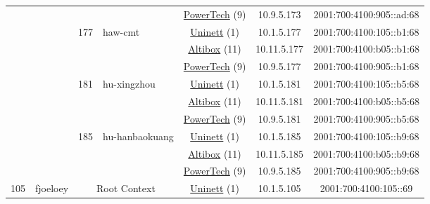 \begin{small}
\begin{center}
\begin{longtable}{|c|c|c|c|c|c|c|c|}
  &  &  &  & \multicolumn{2}{|c|}{\tiny{\href{http://www.powertech.no}{PowerTech} (9)}} & \tiny{10.9.5.173} & \tiny{2001:700:4100:905::ad:68} \\* \cline{3-3}\cline{4-4}\cline{5-5}\cline{6-6}\cline{7-7}\cline{8-8}
  &  & \multirow{3}{*}{\tiny{177}} & \multicolumn{1}{|l|}{\multirow{3}{*}{\tiny{haw-cmt}}} & \multicolumn{2}{|c|}{\tiny{\href{https://www.uninett.no}{Uninett} (1)}} & \tiny{10.1.5.177} & \tiny{2001:700:4100:105::b1:68} \\* \cline{5-5}\cline{6-6}\cline{7-7}\cline{8-8}
  &  &  &  & \multicolumn{2}{|c|}{\tiny{\href{https://www.altibox.no}{Altibox} (11)}} & \tiny{10.11.5.177} & \tiny{2001:700:4100:b05::b1:68} \\* \cline{5-5}\cline{6-6}\cline{7-7}\cline{8-8}
  &  &  &  & \multicolumn{2}{|c|}{\tiny{\href{http://www.powertech.no}{PowerTech} (9)}} & \tiny{10.9.5.177} & \tiny{2001:700:4100:905::b1:68} \\* \cline{3-3}\cline{4-4}\cline{5-5}\cline{6-6}\cline{7-7}\cline{8-8}
  &  & \multirow{3}{*}{\tiny{181}} & \multicolumn{1}{|l|}{\multirow{3}{*}{\tiny{hu-xingzhou}}} & \multicolumn{2}{|c|}{\tiny{\href{https://www.uninett.no}{Uninett} (1)}} & \tiny{10.1.5.181} & \tiny{2001:700:4100:105::b5:68} \\* \cline{5-5}\cline{6-6}\cline{7-7}\cline{8-8}
  &  &  &  & \multicolumn{2}{|c|}{\tiny{\href{https://www.altibox.no}{Altibox} (11)}} & \tiny{10.11.5.181} & \tiny{2001:700:4100:b05::b5:68} \\* \cline{5-5}\cline{6-6}\cline{7-7}\cline{8-8}
  &  &  &  & \multicolumn{2}{|c|}{\tiny{\href{http://www.powertech.no}{PowerTech} (9)}} & \tiny{10.9.5.181} & \tiny{2001:700:4100:905::b5:68} \\* \cline{3-3}\cline{4-4}\cline{5-5}\cline{6-6}\cline{7-7}\cline{8-8}
  &  & \multirow{3}{*}{\tiny{185}} & \multicolumn{1}{|l|}{\multirow{3}{*}{\tiny{hu-hanbaokuang}}} & \multicolumn{2}{|c|}{\tiny{\href{https://www.uninett.no}{Uninett} (1)}} & \tiny{10.1.5.185} & \tiny{2001:700:4100:105::b9:68} \\* \cline{5-5}\cline{6-6}\cline{7-7}\cline{8-8}
  &  &  &  & \multicolumn{2}{|c|}{\tiny{\href{https://www.altibox.no}{Altibox} (11)}} & \tiny{10.11.5.185} & \tiny{2001:700:4100:b05::b9:68} \\* \cline{5-5}\cline{6-6}\cline{7-7}\cline{8-8}
  &  &  &  & \multicolumn{2}{|c|}{\tiny{\href{http://www.powertech.no}{PowerTech} (9)}} & \tiny{10.9.5.185} & \tiny{2001:700:4100:905::b9:68} \\ \hline
 \multirow{39}{*}{\tiny{105}} & \multicolumn{1}{|l|}{\multirow{39}{*}{\tiny{fjoeloey}}} & \multicolumn{2}{|c|}{\multirow{3}{*}{\tiny{Root Context}}} & \multicolumn{2}{|c|}{\tiny{\href{https://www.uninett.no}{Uninett} (1)}} & \tiny{10.1.5.105} & \tiny{2001:700:4100:105::69} \\* \cline{5-5}\cline{6-6}\cline{7-7}\cline{8-8}

\end{longtable}
\end{center}
\end{small}
